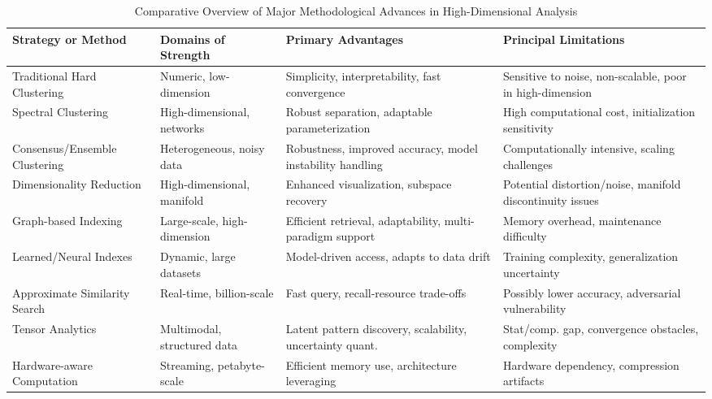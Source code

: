 \documentclass[sigconf]{acmart}
\begin{document}
\begin{table*}[htbp]
\centering
\caption{Comparative Overview of Major Methodological Advances in High-Dimensional Analysis}
\label{tab:method_comparison}
\begin{adjustbox}{max width=\textwidth}
\begin{tabular}{llll}
\toprule
\textbf{Strategy or Method} & \textbf{Domains of Strength} & \textbf{Primary Advantages} & \textbf{Principal Limitations} \\
\midrule
Traditional Hard Clustering    & Numeric, low-dimension      & Simplicity, interpretability, fast convergence             & Sensitive to noise, non-scalable, poor in high-dimension \\
Spectral Clustering           & High-dimensional, networks  & Robust separation, adaptable parameterization              & High computational cost, initialization sensitivity       \\
Consensus/Ensemble Clustering & Heterogeneous, noisy data   & Robustness, improved accuracy, model instability handling  & Computationally intensive, scaling challenges             \\
Dimensionality Reduction      & High-dimensional, manifold  & Enhanced visualization, subspace recovery                  & Potential distortion/noise, manifold discontinuity issues \\
Graph-based Indexing          & Large-scale, high-dimension & Efficient retrieval, adaptability, multi-paradigm support  & Memory overhead, maintenance difficulty                   \\
Learned/Neural Indexes        & Dynamic, large datasets     & Model-driven access, adapts to data drift                  & Training complexity, generalization uncertainty           \\
Approximate Similarity Search & Real-time, billion-scale    & Fast query, recall-resource trade-offs                     & Possibly lower accuracy, adversarial vulnerability        \\
Tensor Analytics              & Multimodal, structured data & Latent pattern discovery, scalability, uncertainty quant.  & Stat/comp. gap, convergence obstacles, complexity         \\
Hardware-aware Computation    & Streaming, petabyte-scale   & Efficient memory use, architecture leveraging              & Hardware dependency, compression artifacts                \\
\bottomrule
\end{tabular}
\end{adjustbox}
\end{table*}
\end{document}
